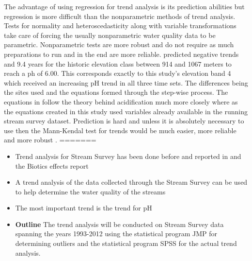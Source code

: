 The advantage of using regression for trend analysis is its prediction abilities but regression is more difficult than the nonparametric methods of trend analysis.  
Tests for normality and heteroscedasticity along with variable transformations take care of forcing the usually nonparametric water quality data to be parametric.  Nonparametric tests are more robust and do not require as much preparations to run and in the end are more reliable.  
\citet{robinson2008ph} predicted negative trends and 9.4 years for the historic elevation class between 914 and 1067 meters to reach a ph of 6.00.  
This corresponds exactly to this study's elevation band 4 which received an increasing pH trend in all three time sets.  
The differences being the sites used and the equations formed through the step-wise process.  
The equations in \citet{robinson2008ph} follow the theory behind acidification much more closely where as the equations created in this study used variables already  available in the running stream survey dataset.  
Prediction is hard and unless it is absolutely necessary to use then the Mann-Kendal test for trends would be much easier, more reliable and more robust \citep{helsel1992statistical}.      
=======
\begin{itemize}
	\item Trend analysis for Stream Survey has been done before and reported in \citep{robinson2008ph} and the Biotics effects report \citep{cai2012}
	\item A trend analysis of the data collected through the Stream Survey can be used to help determine the water quality of the streams
	\item The most important trend is the trend for pH
	\item {\bf Outline} The trend analysis will be conducted on Stream Survey data spanning the years 1993-2012 using the statistical program JMP 
	for determining outliers and the statistical program SPSS for the actual trend analysis.
\end{itemize}
